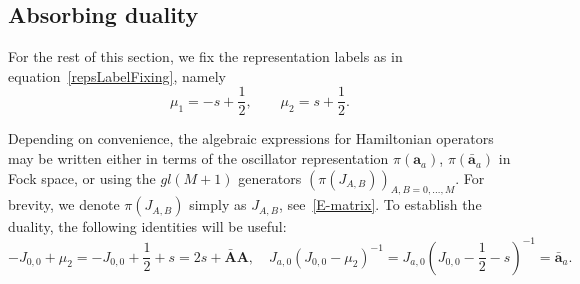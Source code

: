\documentclass[11pt]{article}
\numberwithin{equation}{section}
\newcommand{\oa}{\mathbf{a}}
\newcommand{\oad}{\mathbf{\bar{a}}}
\newcommand{\OA}{\mathbf{A}}
\newcommand{\OAD}{\mathbf{\bar{A}}}
\newcommand{\M}{M}
\newcommand{\eJ}{J}
\begin{document}
\subsection{Absorbing duality}\label{sec:abs}
For the rest of this section, we fix the representation labels as in equation~\eqref{repsLabelFixing}, namely
\begin{equation}
   \mu_1 = -s + \frac{1}{2}, \qquad \mu_2 = s + \frac{1}{2}.
\end{equation}

Depending on convenience, the algebraic expressions for Hamiltonian operators may be written either in terms of the oscillator representation $\pi(\oa_a)$, $\pi(\oad_a)$ in Fock space, or using the $gl(\M+1)$ generators $(\pi(J_{A,B}))_{A,B=0,\ldots,\M}$. For brevity, we denote $\pi(J_{A,B})$ simply as $\eJ_{A,B}$, see~\eqref{E-matrix}.  
To establish the duality, the following identities will be useful:
\begin{equation}\label{good-relation-forFockGLN}
    -\eJ_{0,0} + \mu_2 = -\eJ_{0,0} + \frac{1}{2} + s = 2s + \OAD \OA, 
    \quad 
    \eJ_{a,0} (\eJ_{0,0} - \mu_2)^{-1} = \eJ_{a,0} \left(\eJ_{0,0} - \frac{1}{2} - s\right)^{-1} = \oad_a.
\end{equation}
\end{document}
